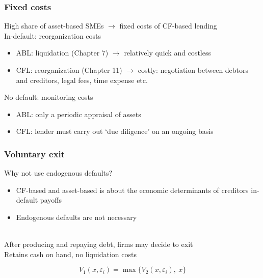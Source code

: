 \documentclass[notes]{beamer}
\begin{document}
\begin{frame}[label=fc] \frametitle{Fixed costs}
High share of asset-based SMEs $\rightarrow$  fixed costs of CF-based lending \vspace{5mm} \\

In-default:  reorganization costs
\begin{itemize}
\item ABL: liquidation (Chapter 7)  $\rightarrow$ relatively quick and costless
\item CFL: reorganization (Chapter 11) $\rightarrow$ costly: negotiation between debtors and creditors, legal fees, time expense etc.
\end{itemize} \vspace{2mm}
No default: monitoring costs
\begin{itemize}
\item ABL: only a periodic appraisal of assets
\item CFL: lender must carry out `due diligence' on an ongoing basis
\end{itemize}

\begin{center}
\hyperlink{nameit}{}
\end{center}
\end{frame}


\begin{frame}[label=volex] \frametitle{Voluntary exit}

Why not use endogenous defaults? 
\begin{itemize} \setlength\itemsep{0em}
    \item CF-based and asset-based is about the economic determinants of creditors in-default payoffs
    \item Endogenous defaults are not necessary   
\end{itemize} \vspace{1mm} \\

After producing and repaying debt, firms may decide to exit \vspace{1mm} \\
Retains cash on hand, no liquidation costs

$$ V_1(x,\varepsilon_i) = \max \Big\{ V_2(x,\varepsilon_i), \ x \Big\} $$

\vfill
\begin{center}
\hyperlink{exdef}{}
\end{center}

\end{frame}
\end{document}
